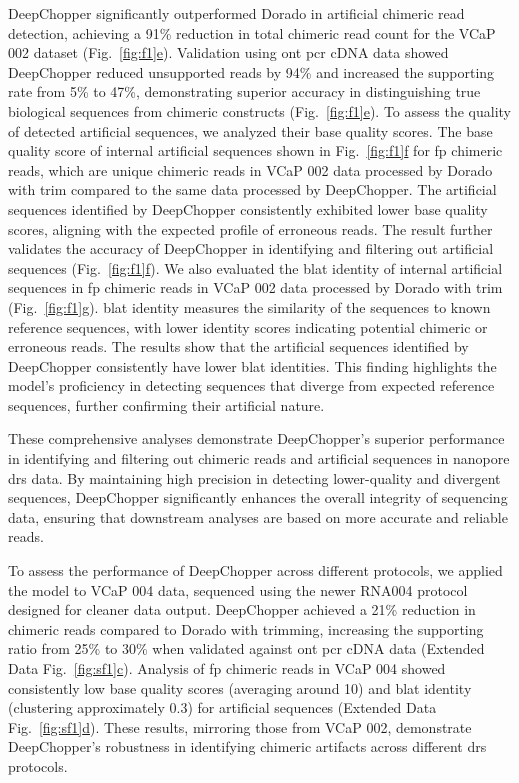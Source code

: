 \documentclass[pdflatex, sn-mathphys-num, lineno]{sn-jnl}%
\newcommand{\figref}[2]{Fig.~\hyperref[#1]{\ref*{#1}#2}}
\newcommand{\edfigref}[2]{Extended Data Fig.~\hyperref[#1]{\ref*{#1}#2}}
\theoremstyle{thmstyleone}%
\theoremstyle{thmstyletwo}%
\theoremstyle{thmstylethree}%
\begin{document}
DeepChopper significantly outperformed Dorado in artificial chimeric read detection, achieving a 91\% reduction in total chimeric read count for the VCaP 002 dataset (\figref{fig:f1}{e}).
Validation using \gls{ont} \gls{pcr} cDNA data showed DeepChopper reduced unsupported reads by 94\% and increased the supporting rate from 5\% to 47\%, demonstrating superior accuracy in distinguishing true biological sequences from chimeric constructs (\figref{fig:f1}{e}).
To assess the quality of detected artificial sequences, we analyzed their base quality scores.
The base quality score of internal artificial sequences shown in \figref{fig:f1}{f}  for \gls{fp} chimeric reads, which are unique chimeric reads in VCaP 002 data processed by Dorado with trim compared to the same data processed by DeepChopper.
The artificial sequences identified by DeepChopper consistently exhibited lower base quality scores, aligning with the expected profile of erroneous reads.
The result further validates the accuracy of DeepChopper in identifying and filtering out artificial sequences (\figref{fig:f1}{f}).
We also evaluated the \gls{blat} identity of internal artificial sequences in \gls{fp} chimeric reads in VCaP 002 data processed by Dorado with trim  (\figref{fig:f1}{g}).
\gls{blat} identity measures the similarity of the sequences to known reference sequences, with lower identity scores indicating potential chimeric or erroneous reads.
The results show that the artificial sequences identified by DeepChopper consistently have lower \gls{blat} identities.
This finding highlights the model's proficiency in detecting sequences that diverge from expected reference sequences, further confirming their artificial nature.

These comprehensive analyses demonstrate DeepChopper's superior performance in identifying and filtering out chimeric reads and artificial sequences in nanopore \gls{drs} data.
By maintaining high precision in detecting lower-quality and divergent sequences, DeepChopper significantly enhances the overall integrity of sequencing data, ensuring that downstream analyses are based on more accurate and reliable reads.

To assess the performance of DeepChopper across different protocols, we applied the model to VCaP 004 data, sequenced using the newer RNA004 protocol designed for cleaner data output.
DeepChopper achieved a 21\% reduction in chimeric reads compared to Dorado with trimming, increasing the supporting ratio from 25\%  to 30\% when validated against \gls{ont} \gls{pcr} cDNA data (\edfigref{fig:sf1}{c}).
Analysis of \gls{fp} chimeric reads in VCaP 004 showed consistently low base quality scores (averaging around 10) and \gls{blat} identity (clustering approximately 0.3) for artificial sequences (\edfigref{fig:sf1}{d}).
These results, mirroring those from VCaP 002, demonstrate DeepChopper's robustness in identifying chimeric artifacts across different \gls{drs} protocols.
\end{document}
